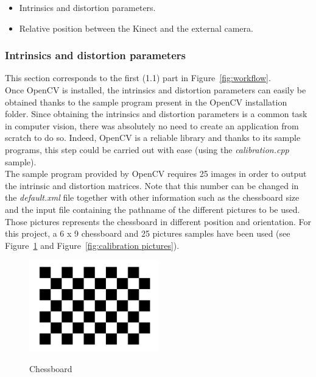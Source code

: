\begin{itemize}
  \item Intrinsics and distortion parameters.
  \item Relative position between the Kinect and the external camera. 
\end{itemize}

\subsubsection{Intrinsics and distortion parameters}
\label{sec:Intrinsics and distortion parameters}
This section corresponds to the first (1.1) part in Figure~\ref{fig:workflow}.\\

Once OpenCV is installed, the intrinsics and distortion parameters can easily be obtained thanks to the sample program present in the OpenCV installation folder. Since obtaining the intrinsics and distortion parameters is a common task in computer vision, there was absolutely no need to create an application from scratch to do so. Indeed, OpenCV is a reliable library and thanks to its sample programs, this step could be carried out with ease (using the \textit{calibration.cpp} sample).\\ 

The sample program provided by OpenCV requires 25 images in order to output the intrinsic and distortion matrices. Note that this number can be changed in the \textit{default.xml} file together with other information such as the chessboard size and the input file containing the pathname of the different pictures to be used.\\ 

Those pictures represents the chessboard in different position and orientation. For this project, a 6 x 9 chessboard and 25 pictures samples have been used (see Figure~\ref{fig:chessboard} and Figure~\ref{fig:calibration pictures}).\\

\begin{figure}
\caption{Chessboard}
\centering
    \includegraphics[width=0.5\textwidth]{images/chessboard.png}
\label{fig:chessboard}
\end{figure}


